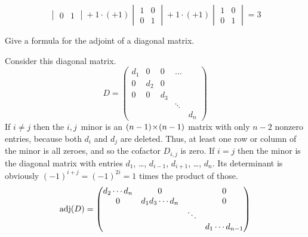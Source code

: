 \begin{exercises}
\begin{answer}
\begin{equation*}
\begin{vmatrix}
               0  &1
             \end{vmatrix}
       +1\cdot (+1)\begin{vmatrix}
               1  &0  \\
               0  &1
             \end{vmatrix}
       +1\cdot (+1)\begin{vmatrix}
               1  &0  \\
               0  &1
             \end{vmatrix}=3
      \end{equation*}  
    \end{answer}
  \item 
    Give a formula for the adjoint of a diagonal matrix.
    \begin{answer}
      Consider this diagonal matrix.
      \begin{equation*}
        D=
        \begin{pmatrix}
          d_1  &0   &0   &\ldots    \\
          0    &d_2 &0   &          \\
          0    &0   &d_3            \\
               &    &    &\ddots    \\
               &    &    &      &d_n   
        \end{pmatrix}
      \end{equation*}
      If $i\neq j$ then the $i,j$~minor is an $(n-1) \! \times \! (n-1)$ matrix
      with only $n-2$ nonzero entries, because both $d_i$ and $d_j$ are
      deleted.
      Thus, at least one row or column of the minor is all zeroes, and
      so the cofactor $D_{i,j}$ is zero.
      If $i=j$ then the minor is the diagonal matrix with entries
      $d_1$, \ldots, $d_{i-1}$, $d_{i+1}$, \ldots, $d_n$.
      Its determinant is obviously $(-1)^{i+j}=(-1)^{2i}=1$ 
      times the product of those.
      \begin{equation*}
        \operatorname{adj}(D)
        =
        \begin{pmatrix}
          d_2\cdots d_n    &0                 &      &0    \\
          0                &d_1d_3\cdots d_n  &      &0    \\
                           &                  &\ddots      \\
                           &                  &       &d_1\cdots d_{n-1} 
        \end{pmatrix}
      \end{equation*}


\end{answer}
\end{exercises}
